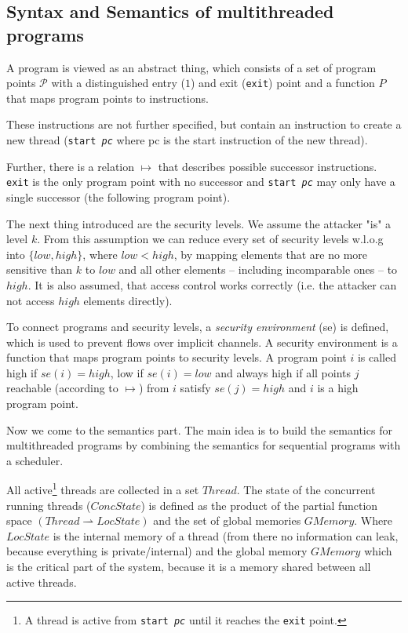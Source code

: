 \documentclass[a4paper,10pt]{llncs}
\begin{document}
\subsection{Syntax and Semantics of multithreaded programs}
\label{sec:syntaxsemantics}
A program is viewed as an abstract thing, which consists of a set of
program points $\mathcal{P}$ with a distinguished entry ($1$) and exit
(\texttt{exit}) point and a function $P$ that maps program points to
instructions.

These instructions are not further specified, but contain an instruction
to create a new thread (\texttt{start \textit{pc}} where pc is the start
instruction of the new thread).

Further, there is a relation $\mapsto$ that describes possible successor
instructions. \texttt{exit} is the only program point with no successor
and \texttt{start \textit{pc}} may only have a single successor (the
following program point).

The next thing introduced are the security levels. We assume the attacker
"is" a level $k$. From this assumption we can reduce every set of security levels
w.l.o.g into $\{low, high\}$, where $low < high$, by mapping elements
that are no more sensitive than $k$ to $low$ and all other elements
-- including incomparable ones -- to $high$. It is also assumed, that access
control works correctly (i.e. the attacker can not access $high$ elements
directly).

To connect programs and security levels, a \textit{security environment}
(se) is defined, which is used to prevent flows over implicit channels.
A security environment is a function that maps program points to security
levels. A program point $i$ is called high if $se(i) = high$, low if $se(i)
= low$ and always high if all points $j$ reachable (according to $\mapsto$)
from $i$ satisfy $se(j) = high$ and $i$ is a high program point.

Now we come to the semantics part. The main idea is to build the semantics
for multithreaded programs by combining the semantics for sequential programs
with a scheduler.

All active\footnote{A thread is active from \texttt{start \textit{pc}} until
it reaches the \texttt{exit} point.} threads are collected in a set $Thread$.
The state of the concurrent running threads ($ConcState$) is defined as the
product of the partial function space $(Thread \rightharpoonup LocState)$
and the set of global memories $GMemory$. Where $LocState$ is the internal
memory of a thread (from there no information can leak, because everything is private/internal) and the global memory $GMemory$ which is
the critical part of the system, because it is a memory shared between all
active threads.
\end{document}
